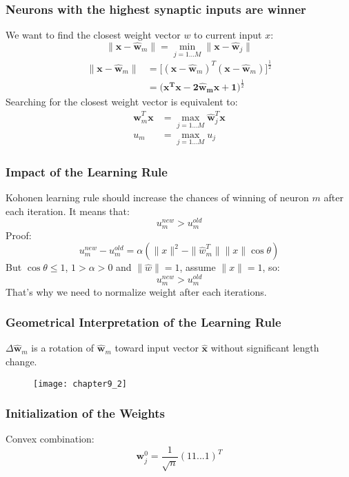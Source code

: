 \subsubsection{Neurons with the highest synaptic inputs are winner}
We want to find the closest weight vector $w$ to current input $x$:
$$\| \mathbf{x} - \mathbf{\hat{w}}_m \| = \!\min_{j=1...M} \| \mathbf{x} - \mathbf{\hat{w}}_j \|$$
\begin{equation*}
\begin{split}
\| \mathbf{x} - \mathbf{\hat{w}}_m \| &= \Big[(\mathbf{x} - \mathbf{\hat{w}}_m)^{T}(\mathbf{x} - \mathbf{\hat{w}}_m) \Big]^{\frac{1}{2}} \\
&= \Big(\mathbf{x^{T}x - 2\hat{w}_{m}x + 1} \Big)^{\frac{1}{2}}
\end{split}
\end{equation*}
Searching for the closest weight vector is equivalent to:
\begin{equation*}
\begin{split}
\mathbf{\hat{w}}_m^{T} \mathbf{x} &= \!\max_{j=1...M} \mathbf{\hat{w}}_j^{T} \mathbf{x} \\
u_m &= \!\max_{j=1...M} u_j
\end{split}
\end{equation*}

\subsubsection{Impact of the Learning Rule}
Kohonen learning rule should increase the chances of winning of neuron $m$ after each iteration. It means that:
$$u_m^{new} > u_m^{old}$$
Proof:
$$u_m^{new} - u_m^{old} = \alpha (\| x \|^{2} - \| \hat{w}_m^{T} \| \|x\|\cos \theta)$$
But $\cos \theta \le 1$, $1 > \alpha > 0$ and $\|\hat{w}\| = 1$, assume $\|x\| = 1$, so: 
$$u_m^{new} > u_m^{old}$$
That's why we need to normalize weight after each iterations.

\subsubsection{Geometrical Interpretation of the Learning Rule}
$\Delta \mathbf{\hat{w}}_m$ is a rotation of $\mathbf{\hat{w}}_m$ toward input vector $\mathbf{\hat{x}}$ without significant length change. 
\begin{figure}[!h]
\centering
\texttt{[image: chapter9\_2]}
\end{figure}

\subsubsection{Initialization of the Weights}
Convex combination:
$$\mathbf{w}_j^{0} = \frac{1}{\sqrt{n}} (1 1 ... 1)^{T}$$

